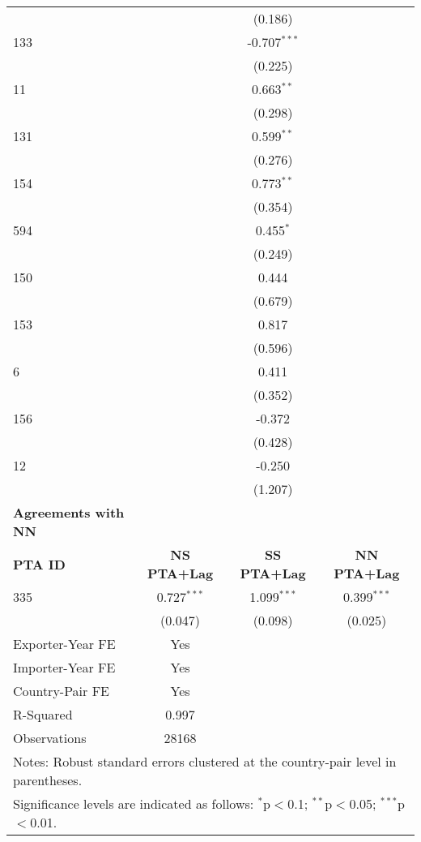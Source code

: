 \begin{longtable}{lccc}
    &  & (0.186) &  \\
    133 &  & -0.707$^{\ast\ast\ast}$ &  \\
    &  & (0.225) &  \\
    11  &  & 0.663$^{\ast\ast}$ &  \\
    &  & (0.298) &  \\
    131  &  & 0.599$^{\ast\ast}$ &  \\
    &  & (0.276) &  \\
    154  &  & 0.773$^{\ast\ast}$ &  \\
    &  & (0.354) &  \\
    594  &  & 0.455$^{\ast}$ &  \\
    &  & (0.249) &  \\
    150 &  & 0.444 &  \\
    &  & (0.679) &  \\
    153 &  & 0.817 &  \\
    &  & (0.596) &  \\
    6   &  & 0.411 &  \\
    &  & (0.352) &  \\
    156   &  & -0.372 &  \\
    &  & (0.428) &  \\
    12   &  & -0.250 &  \\
    &  & (1.207) &  \\
    \hline
    \textbf{Agreements with NN} &  &  &  \\
    \hline
    \textbf{PTA ID} & \textbf{NS PTA+Lag} & \textbf{SS PTA+Lag} & \textbf{NN PTA+Lag} \\
    \hline
    335 & 0.727$^{\ast\ast\ast}$ & 1.099$^{\ast\ast\ast}$ & 0.399$^{\ast\ast\ast}$ \\
    & (0.047) & (0.098) & (0.025) \\
    \hline
    Exporter-Year FE & Yes \\
    Importer-Year FE & Yes \\
    Country-Pair FE & Yes \\
    R-Squared & 0.997 \\
    Observations & 28168 \\
    \hline
    \multicolumn{4}{l}{\footnotesize{Notes: Robust standard errors clustered at the country-pair level in parentheses.}} \\
    \multicolumn{4}{l}{\footnotesize{Significance levels are indicated as follows: $^{\ast}$p$<$0.1; $^{\ast\ast}$p$<$0.05; $^{\ast\ast\ast}$p$<$0.01.}} \\
\end{longtable}


